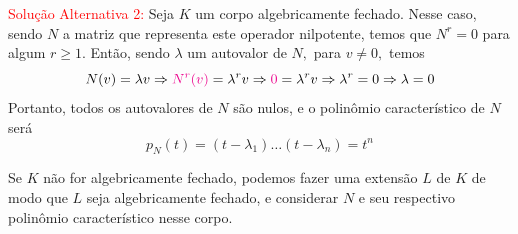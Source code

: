 \documentclass[11pt,a4paper]{article}
\begin{document}
\bigskip
\noindent
\textcolor{red}{Solução Alternativa 2:} Seja $K$ um corpo algebricamente fechado. Nesse caso, sendo $N$ a matriz que representa este operador nilpotente, temos que $N^r = 0$ para algum $r\geq 1.$ Então, sendo $\lambda$ um autovalor de $N,$ para $v \neq 0,$ temos
\[
N(v) = \lambda v \Rightarrow \textcolor{Magenta}{N^r(v)} = \lambda^r v  \Rightarrow \textcolor{Magenta}{0} = \lambda^r v \Rightarrow \lambda^r = 0 \Rightarrow \lambda = 0
\]
Portanto, todos os autovalores de $N$ são nulos, e o polinômio característico de $N$ será
\[
p_N(t) = (t - \lambda_1) \ldots (t  - \lambda_n) = t^n
\]

Se $K$ não for algebricamente fechado, podemos fazer uma extensão $L$ de $K$ de modo que $L$ seja algebricamente fechado, e considerar $N$ e seu respectivo polinômio característico nesse corpo.
   
\end{document}
